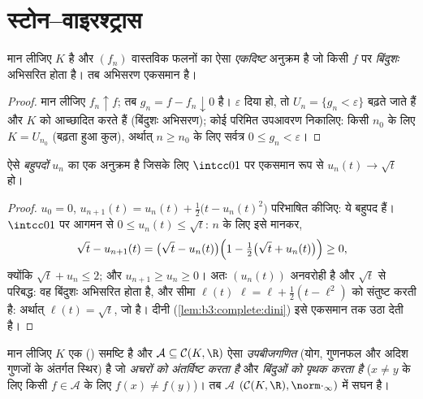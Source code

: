 \section{स्टोन--वाइरश्ट्रास}

\begin{lemma}[दीनी]\label{lem:b3:complete:dini}
मान लीजिए $K$  है और $(f_n)$  वास्तविक फलनों का ऐसा
\emph{एकदिष्ट} अनुक्रम है जो किसी  $f$ पर \emph{बिंदुशः}
अभिसरित होता है। तब अभिसरण एकसमान है।
\end{lemma}

\begin{proof}
मान लीजिए $f_n \uparrow f$; तब $g_n = f - f_n \downarrow 0$  है। $\varepsilon$ दिया हो, तो  $U_n = \{g_n <
\varepsilon\}$ बढ़ते जाते हैं और $K$ को आच्छादित करते हैं
(बिंदुशः अभिसरण); कोई परिमित उपआवरण निकालिए: किसी $n_0$ के लिए
$K = U_{n_0}$ (बढ़ता हुआ कुल), अर्थात् $n \geq n_0$ के लिए सर्वत्र $0 \leq g_n < \varepsilon$।
\end{proof}

\begin{lemma}\label{lem:b3:complete:sqrt}
ऐसे \emph{बहुपदों} $u_n$ का एक अनुक्रम है जिसके लिए $\intcc01$ पर
एकसमान रूप से $u_n(t) \to
\sqrt t$ हो।
\end{lemma}

\begin{proof}
$u_0 = 0$, $u_{n+1}(t) = u_n(t) + \frac12\bigl(t -
u_n(t)^2\bigr)$ परिभाषित कीजिए: ये बहुपद हैं। $\intcc01$ पर आगमन से
$0 \leq u_n(t) \leq
\sqrt t$: $n$ के लिए इसे मानकर,
\[
\sqrt t - u_{n+1}(t) = \bigl(\sqrt t - u_n(t)\bigr)
\Bigl(1 - \tfrac12\bigl(\sqrt t + u_n(t)\bigr)\Bigr) \geq 0,
\]
क्योंकि $\sqrt t + u_n \leq 2$; और $u_{n+1} \geq u_n \geq 0$। अतः $(u_n(t))$ अनवरोही है और $\sqrt t$ से
परिबद्ध: वह बिंदुशः अभिसरित होता है, और सीमा $\ell(t)$ $\ell =
\ell + \frac12(t - \ell^2)$ को
संतुष्ट करती है: अर्थात् $\ell(t) = \sqrt t$, जो  है। दीनी (\cref{lem:b3:complete:dini}) इसे
एकसमान तक उठा देती है।
\end{proof}

\begin{theorem}[स्टोन--वाइरश्ट्रास, वास्तविक रूप]
\label{thm:b3:complete:stoneweierstrass}
मान लीजिए $K$ एक  () समष्टि है और $\mathcal A \subseteq
\mathcal C(K, \R)$ ऐसा
\emph{उपबीजगणित} (योग, गुणनफल और अदिश गुणजों के अंतर्गत स्थिर) है
जो \emph{अचरों को अंतर्विष्ट करता है} और \emph{बिंदुओं को पृथक
करता है} ($x \neq y$ के लिए किसी $f \in
\mathcal A$ के लिए $f(x) \neq f(y)$)। तब $\mathcal A$ $(\mathcal C(K,\R), \norm\cdot_\infty)$
में सघन है।
\end{theorem}

